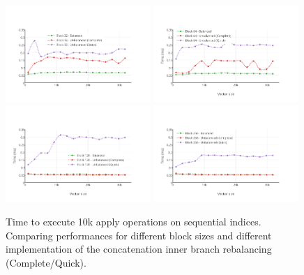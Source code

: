 \begin{figure}[h!]
  \centering
  \includegraphics[width=0.49\textwidth]{Benchmarks/Apply_blocks_32.pdf}
  \includegraphics[width=0.49\textwidth]{Benchmarks/Apply_blocks_64.pdf}
  \includegraphics[width=0.49\textwidth]{Benchmarks/Apply_blocks_128.pdf}
  \includegraphics[width=0.49\textwidth]{Benchmarks/Apply_blocks_256.pdf}
  \label{ApplyBlocksBenchmarks}
  \caption{Time to execute 10k apply operations on sequential indices. Comparing performances for different block sizes and different implementation of the concatenation inner branch rebalancing (Complete/Quick).}
\end{figure}

